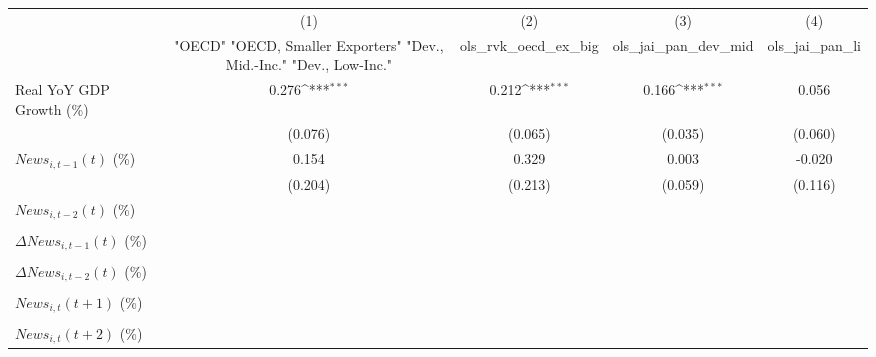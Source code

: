 {
\def\sym#1{\ifmmode^{#1}\else\(^{#1}\)\fi}
\begin{tabular}{l*{4}{c}}
\toprule
                    &\multicolumn{1}{c}{(1)}&\multicolumn{1}{c}{(2)}&\multicolumn{1}{c}{(3)}&\multicolumn{1}{c}{(4)}\\
                    &\multicolumn{1}{c}{ "OECD" "OECD, Smaller Exporters" "Dev., Mid.-Inc." "Dev., Low-Inc."}&\multicolumn{1}{c}{ols_rvk_oecd_ex_big}&\multicolumn{1}{c}{ols_jai_pan_dev_mid}&\multicolumn{1}{c}{ols_jai_pan_li}\\
\midrule
Real YoY GDP Growth (\%)&       0.276\sym{***}&       0.212\sym{***}&       0.166\sym{***}&       0.056         \\
                    &     (0.076)         &     (0.065)         &     (0.035)         &     (0.060)         \\
\addlinespace
$ News_{i,t-1}(t)$ (\%)&       0.154         &       0.329         &       0.003         &      -0.020         \\
                    &     (0.204)         &     (0.213)         &     (0.059)         &     (0.116)         \\
\addlinespace
$ News_{i,t-2}(t)$ (\%)&                     &                     &                     &                     \\
                    &                     &                     &                     &                     \\
\addlinespace
$ \Delta News_{i,t-1}(t)$ (\%)&                     &                     &                     &                     \\
                    &                     &                     &                     &                     \\
\addlinespace
$ \Delta News_{i,t-2}(t)$ (\%)&                     &                     &                     &                     \\
                    &                     &                     &                     &                     \\
\addlinespace
$ News_{i,t}(t+1)$ (\%)&                     &                     &                     &                     \\
                    &                     &                     &                     &                     \\
\addlinespace
$ News_{i,t}(t+2)$ (\%)&                     &                     &                     &                     \\

\end{tabular}}
